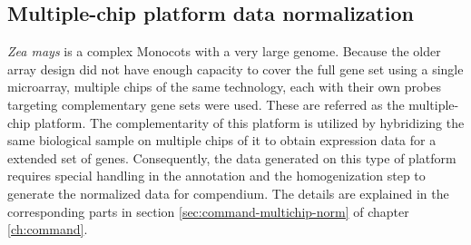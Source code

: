 

\subsection{Multiple-chip platform data normalization}

\textit{Zea mays} is a complex Monocots with a very large genome.
%
Because the older array design did not have enough capacity to cover
the full gene set using a single microarray, multiple chips of the
same technology, each with their own probes targeting complementary
gene sets were used.  These are referred as the multiple-chip
platform.
%
The complementarity of this platform is utilized by hybridizing the
same biological sample on multiple chips of it to obtain expression
data for a extended set of genes.
%
Consequently, the data generated on this type of platform requires
special handling in the annotation and the homogenization step to
generate the normalized data for compendium.
%
The details are explained in the corresponding parts in section
\ref{sec:command-multichip-norm} of chapter \ref{ch:command}.




